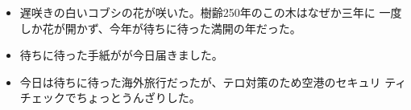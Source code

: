 \documentclass[
uplatex,
b5paper,
10pt,
dvipdfmx
]{jsbook}
\begin{document}
\begin{enumerate}
 \begin{itemize}
  \item 遅咲きの白いコブシの花が咲いた。樹齢250年のこの木はなぜか三年に
       一度しか花が開かず、今年が待ちに待った満開の年だった。
  \item 待ちに待った手紙がが今日届きました。
  \item 今日は待ちに待った海外旅行だったが、テロ対策のため空港のセキュリ
	ティチェックでちょ{}っとうんざりした。
 \end{itemize}


\end{enumerate}

\end{document}
